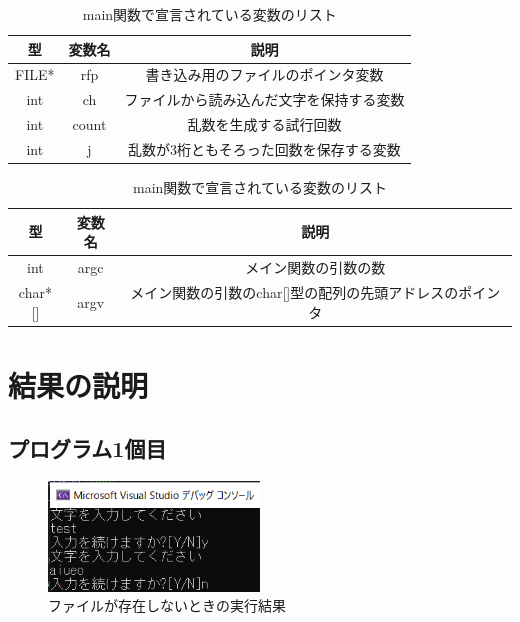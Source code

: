 \documentclass[dvipdfmx]{jsarticle}
\begin{document}
\begin{table}[ht]
  \centering
  \begin{tabular}{|c|c|c|}
    \hline
    型     & 変数名 & 説明                         \\
    \hline
    FILE* & rfp & 書き込み用のファイルのポインタ変数          \\
    int   & ch  & ファイルから読み込んだ文字を保持する変数 \\
    int   & count &  乱数を生成する試行回数\\
    int   & j & 乱数が3桁ともそろった回数を保存する変数\\
    \hline
  \end{tabular}
  \caption{main関数で宣言されている変数のリスト}
  \label{table:variables2}
\end{table}

\begin{table}[ht]
  \centering
  \begin{tabular}{|c|c|c|}
    \hline
    型       & 変数名  & 説明                              \\
    \hline
    int     & argc & メイン関数の引数の数                      \\
    char*[] & argv & メイン関数の引数のchar[]型の配列の先頭アドレスのポインタ \\
    \hline
  \end{tabular}
  \caption{main関数で宣言されている変数のリスト}
  \label{table:arguments2}
\end{table}


\section{結果の説明}
\subsection{プログラム1個目}
\begin{figure}[ht]
  \centering
  \includegraphics[width=0.5\textwidth]{./img/result_pr1_ndup.png}
  \caption{ファイルが存在しないときの実行結果}
  \label{fig:result_pr1_ndup}
\end{figure}
\end{document}
